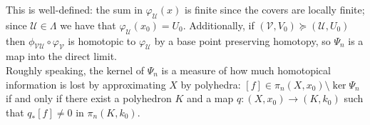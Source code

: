 \documentclass[a4paper,11pt]{article}
\theoremstyle{definition}
\theoremstyle{plain}
\theoremstyle{remark}
\begin{document}
{ This is well-defined: the sum in $\varphi_{\mathcal{U}}(x)$ is finite since the covers are locally finite; since $\mathcal{U}\in \Lambda$ we have that $\varphi_{\mathcal{U}}(x_0) = U_{0}$. Additionally, if $(\mathcal{V},V_{0})\succeq (\mathcal{U}, U_{0})$ then $\phi_{\mathcal{V}\mathcal{U}} \circ \varphi_{\mathcal{V}}$ is homotopic to $\varphi_{\mathcal{U}}$ by a base point preserving homotopy, so $\Psi_{n}$ is a map into the direct limit. \\

Roughly speaking, the kernel of $\Psi_{n}$ is a measure of how much homotopical information is lost by approximating $X$ by polyhedra: $[f]\in \pi_{n}(X,x_0)\setminus \ker{\Psi_{n}}$ if and only if there exist a polyhedron $K$ and a map $q: (X,x_0)\rightarrow (K,k_0)$ such that $q_{*}[f]\neq 0$ in $\pi_{n}(K,k_0)$. 

}
\end{document}
